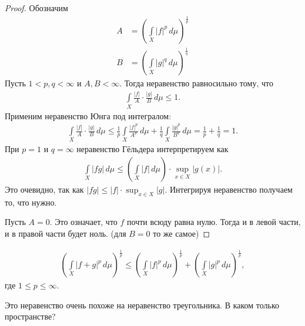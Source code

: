\begin{proof}
 Обозначим \begin{align*}
  A &= \left( \int\limits_{X} \left| f \right|^{p} \, d\mu   \right)^{\frac{1}{p}} \\
  B &= \left( \int\limits_{X} \left| g \right|^{q} \, d\mu   \right)^{\frac{1}{q}}
 \end{align*} 
 Пусть $1 < p, q < \infty$ и $A, B < \infty$. Тогда неравенство равносильно тому, что \begin{align*}
  \int\limits_{X} \frac{\left| f \right|}{A} \cdot \frac{\left| g \right|}{B} \, d\mu   \leqslant 1
 .\end{align*} Применим неравенство Юнга под интегралом: \begin{align*}
 \int\limits_{X} \frac{\left| f \right|}{A} \cdot \frac{\left| g \right|}{B} \, d\mu \leqslant \frac{1}{p}\int\limits_{X} \frac{\left| f \right|^{p}}{A^{p}} \, d\mu   + \frac{1}{q} \int\limits_{X} \frac{\left| g \right|^{p}}{B^{q}} \, d\mu   = \frac{1}{p} + \frac{1}{q} = 1
 .\end{align*} При $p = 1$ и $q = \infty$ неравенство Гёльдера интерпретируем как \begin{align*}
 \int\limits_{X} \left| f g\right| \, d\mu  \leqslant \left( \int\limits_{X} \left| f \right| \, d\mu   \right) \cdot \sup_{x \in X} \left| g(x) \right|
.\end{align*} Это очевидно, так как $\left| fg \right| \leqslant \left| f \right| \cdot \sup_{x \in X} \left| g \right|$. Интегрируя неравенство получаем то, что нужно.

Пусть $A = 0$. Это означает, что  $f$ почти всюду равна нулю. Тогда и в левой части, и в правой части будет ноль. (для $B = 0$ то же самое)
\end{proof}
\begin{thm}
 \begin{align*}
  \left( \int\limits_{X} \left| f+g \right|^{p} \, d\mu \right)^{\frac{1}{p}} \leqslant \left( \int\limits_{X} \left| f \right|^{p} \, d\mu   \right)^{\frac{1}{p}} + \left( \int\limits_{X} \left| g \right|^{p} \, d\mu   \right)^{\frac{1}{p}}
 ,\end{align*} где $1 \leqslant p \leqslant \infty$.
\end{thm}
Это неравенство очень похоже на неравенство треугольника. В каком только пространстве?

